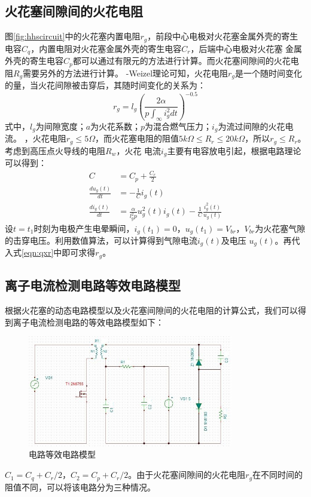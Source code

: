 \subsection{火花塞间隙间的火花电阻}
图\ref{fig:hhscircuit}中的火花塞内置电阻$r_{g}$，前段中心电极对火花塞金属外壳的寄生电容$C_{q}$，内置电阻对火花塞金属外壳的寄生电容$C_{r}$，后端中心电极对火花塞
金属外壳的寄生电容$C_{p}$都可以通过有限元的方法进行计算\cite{zyl2011}。而火花塞间隙间的火花电阻$R_{g}$需要另外的方法进行计算。
-Weizel理论可知，火花电阻$r_{g}$是一个随时间变化的量，当火花间隙被击穿后，其随时间变化的关系为：
\begin{equation}
	\label{eqn:qxr}
	r_{g}=l_{g}(\frac{2\alpha}{p\int_{\infty}i_{g}^{2}dt})^{-0.5}
\end{equation}
式中，$l_{g}$为间隙宽度；$a$为火花系数；$p$为混合燃气压力；$i_{g}$为流过间隙的火花电流。
，火花电阻$r_{g}\leq5\Omega$，而火花塞电阻的阻值$5k\Omega\leq R_{r}\leq 20k\Omega$，所以$r_{g}\leq R_{r}$。考虑到高压点火导线的电阻$R_{w}$，火花
电流$i_{g}$主要有电容放电引起，根据电路理论可以得到：
\begin{align}
C &= C_{p}+\frac{C_{r}}{2}\\
\frac{du_{g}(t)}{dt}&=-\frac{1}{C}i_{g}(t)\\
\frac{di_{g}(t)}{dt}&=\frac{\alpha}{l_{g}^{2}p}u_{g}^{2}(t)i_{g}(t)-\frac{1}{C}\frac{i_{g}^{2}(t)}{u_{g}(t)}
\end{align}
设$t=t_{1}$时刻为电极产生电晕瞬间，$i_{g}(t_{1})=0$，$u_{g}(t_{1})=V_{br}$，$V_{br}$为火花塞气隙的击穿电压。利用数值算法，可以计算得到气隙电流$i_{g}(t)$及电压
$u_{g}(t)$。再代入式\ref{eqn:qxr}中即可求得$r_{g}$。
\subsection{离子电流检测电路等效电路模型}
根据火花塞的动态电路模型以及火花塞间隙间的火花电阻的计算公式，我们可以得到离子电流检测电路的等效电路模型如下：
\begin{figure}[!h]
	\centering
	\includegraphics[width=0.8\textwidth]{thesis_figure/cmp_circuit}
	\caption{电路等效电路模型}
	\label{fig:cmp_circuit}
\end{figure}
$C_{1}=C_{q}+C_{r}/2$，$C_{2}=C_{p}+C_{r}/2$。由于火花塞间隙间的火花电阻$r_{g}$在不同时间的阻值不同，可以将该电路分为三种情况。
